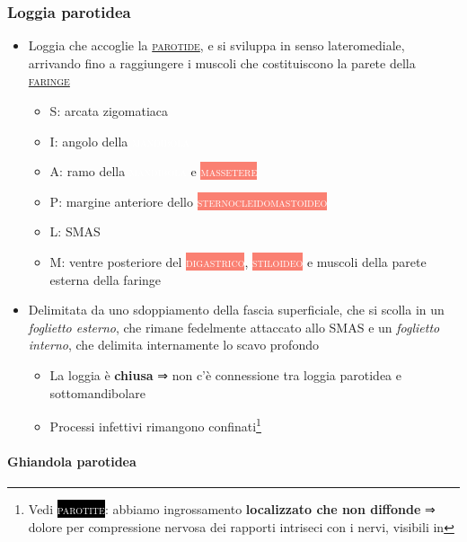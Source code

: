 \documentclass[italian,]{article}
\providecommand{\tightlist}{%
  \setlength{\itemsep}{0pt}\setlength{\parskip}{0pt}}
\newcommand{\mus}[1]{\colorbox{Salmon}{\textcolor{white}{\textsc{#1}}}}
\newcommand{\oss}[1]{\colorbox{ossa}{\textcolor{white}{\textsc{#1}}}}
\newcommand{\pat}[1]{\colorbox{black}{\textcolor{white}{\textsc{#1}}}}
\renewcommand{\a}[1]{\underline{\textsc{#1}}}
\newcommand{\nnetter}[1]{ \fbox{\textsf{Netter (2018), plate #1}} }
\begin{document}
\hypertarget{loggia-parotidea}{%
\subsubsection{Loggia parotidea}\label{loggia-parotidea}}

\begin{itemize}
\tightlist
\item
  Loggia che accoglie la \a{parotide}, e si sviluppa in senso
  lateromediale, arrivando fino a raggiungere i muscoli che
  costituiscono la parete della \a{faringe}

  \begin{itemize}
  \tightlist
  \item
    S: arcata zigomatiaca
  \item
    I: angolo della \oss{mandibola}
  \item
    A: ramo della \oss{mandibola} e \mus{massetere}
  \item
    P: margine anteriore dello \mus{sternocleidomastoideo}
  \item
    L: SMAS
  \item
    M: ventre posteriore del \mus{digastrico}, \mus{stiloideo} e muscoli
    della parete esterna della faringe
  \end{itemize}
\item
  Delimitata da uno sdoppiamento della fascia superficiale, che si
  scolla in un \emph{foglietto esterno}, che rimane fedelmente attaccato
  allo SMAS e un \emph{foglietto interno}, che delimita internamente lo
  scavo profondo

  \begin{itemize}
  \tightlist
  \item
    La loggia è \textbf{chiusa} ⇒ non c'è connessione tra loggia
    parotidea e sottomandibolare
  \item
    Processi infettivi rimangono confinati\footnote{Vedi \pat{parotite}:
      abbiamo ingrossamento \textbf{localizzato che non diffonde} ⇒
      dolore per compressione nervosa dei rapporti intriseci con i
      nervi, visibili in \nnetter{54}}
  \end{itemize}
\end{itemize}

\hypertarget{ghiandola-parotidea}{%
\paragraph{Ghiandola parotidea}\label{ghiandola-parotidea}}
\end{document}
